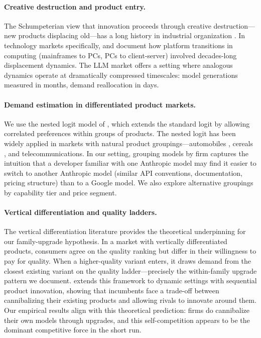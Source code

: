 \documentclass[11pt, a4paper]{article}
\begin{document}
\paragraph{Creative destruction and product entry.} The Schumpeterian view that innovation proceeds through creative destruction---new products displacing old---has a long history in industrial organization \citep{arrow1962economic, reinganum1983uncertain, grossman1991innovation, aghion2005competition}. In technology markets specifically, \citet{bresnahan1999technological} and \citet{bresnahan2011schumpeterian} document how platform transitions in computing (mainframes to PCs, PCs to client-server) involved decades-long displacement dynamics. The LLM market offers a setting where analogous dynamics operate at dramatically compressed timescales: model generations measured in months, demand reallocation in days.

\paragraph{Demand estimation in differentiated product markets.} We use the nested logit model of \citet{berry1994estimating}, which extends the standard logit by allowing correlated preferences within groups of products. The nested logit has been widely applied in markets with natural product groupings---automobiles \citep{berry1995automobile}, cereals \citep{nevo2000practitioners}, and telecommunications. In our setting, grouping models by firm captures the intuition that a developer familiar with one Anthropic model may find it easier to switch to another Anthropic model (similar API conventions, documentation, pricing structure) than to a Google model. We also explore alternative groupings by capability tier and price segment.

\paragraph{Vertical differentiation and quality ladders.} The vertical differentiation literature \citep{shaked1982relaxing, tirole1988theory} provides the theoretical underpinning for our family-upgrade hypothesis. In a market with vertically differentiated products, consumers agree on the quality ranking but differ in their willingness to pay for quality. When a higher-quality variant enters, it draws demand from the closest existing variant on the quality ladder---precisely the within-family upgrade pattern we document. \citet{baron2020vertical} extends this framework to dynamic settings with sequential product innovation, showing that incumbents face a trade-off between cannibalizing their existing products and allowing rivals to innovate around them. Our empirical results align with this theoretical prediction: firms do cannibalize their own models through upgrades, and this self-competition appears to be the dominant competitive force in the short run.
\end{document}
